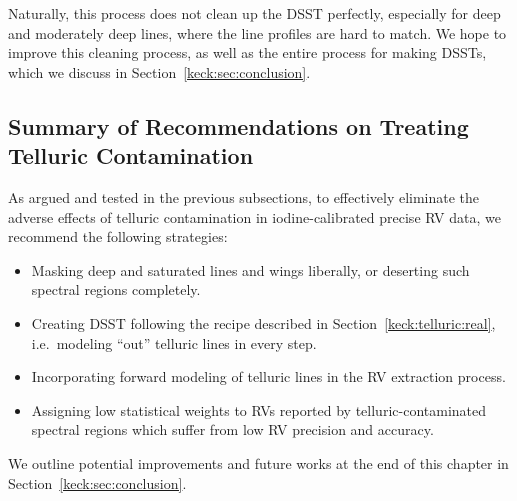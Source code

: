 Naturally, this process does not clean up the DSST perfectly,
especially for deep and moderately deep lines, where the line profiles
are hard to match. We hope to improve this cleaning process, as well
as the entire process for making DSSTs, which we discuss in
Section~\ref{keck:sec:conclusion}. 


\subsection{Summary of Recommendations on Treating Telluric
  Contamination}\label{keck:telluric:summary} 

As argued and tested in the previous subsections, to effectively
eliminate the adverse effects of telluric contamination in
iodine-calibrated precise RV data, we recommend the following
strategies:
\begin{itemize}
  \item Masking deep and saturated lines and wings liberally, or
    deserting such spectral regions completely.
  \item Creating DSST following the recipe described in
    Section~\ref{keck:telluric:real}, i.e.\ modeling ``out'' telluric
    lines in every step. 
  \item Incorporating forward modeling of telluric lines in the RV
    extraction process.
  \item Assigning low statistical weights to RVs reported by
    telluric-contaminated spectral regions which suffer from low RV
    precision and accuracy.
\end{itemize}

We outline potential improvements and future works at the end of this
chapter in Section~\ref{keck:sec:conclusion}.